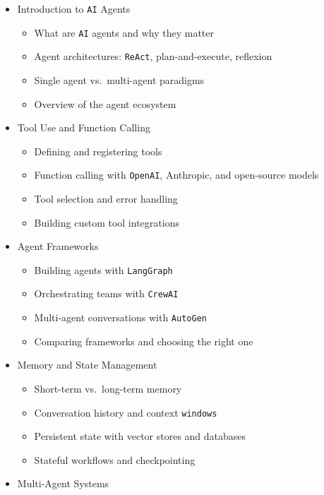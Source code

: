 \documentclass[
]{article}
\providecommand{\tightlist}{%
  \setlength{\itemsep}{0pt}\setlength{\parskip}{0pt}}
\begin{document}
\begin{itemize}
\tightlist
\item
  Introduction to \texttt{AI} Agents

  \begin{itemize}
  \tightlist
  \item
    What are \texttt{AI} agents and why they matter
  \item
    Agent architectures: \texttt{ReAct}, plan-and-execute, reflexion
  \item
    Single agent vs.~multi-agent paradigms
  \item
    Overview of the agent ecosystem
  \end{itemize}
\item
  Tool Use and Function Calling

  \begin{itemize}
  \tightlist
  \item
    Defining and registering tools
  \item
    Function calling with \texttt{OpenAI}, Anthropic, and open-source
    models
  \item
    Tool selection and error handling
  \item
    Building custom tool integrations
  \end{itemize}
\item
  Agent Frameworks

  \begin{itemize}
  \tightlist
  \item
    Building agents with \texttt{LangGraph}
  \item
    Orchestrating teams with \texttt{CrewAI}
  \item
    Multi-agent conversations with \texttt{AutoGen}
  \item
    Comparing frameworks and choosing the right one
  \end{itemize}
\item
  Memory and State Management

  \begin{itemize}
  \tightlist
  \item
    Short-term vs.~long-term memory
  \item
    Conversation history and context \texttt{windows}
  \item
    Persistent state with vector stores and databases
  \item
    Stateful workflows and checkpointing
  \end{itemize}
\item
  Multi-Agent Systems


\end{itemize}
\end{document}
